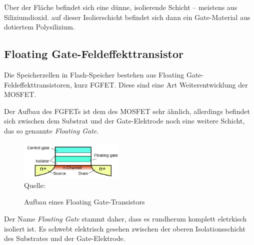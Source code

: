 Über der Fläche befindet sich eine dünne, isolierende Schicht -- meistens aus Siliziumdioxid. auf dieser Isolierschicht befindet sich dann ein Gate-Material aus \gls{dotiert}em Polysilizium.

\subsection{Floating Gate-Feldeffekttransistor}\label{sec:fgfet}
Die Speicherzellen in Flash-Speicher bestehen aus Floating Gate-Feldeffekttransistoren, kurz FGFET. Diese sind eine Art Weiterentwicklung der MOSFET.

Der Aufbau des FGFETs ist dem des MOSFET sehr ähnlich, allerdings befindet sich zwischen dem Substrat und der Gate-Elektrode noch eine weitere Schicht, das so genannte \emph{Floating Gate}.

\begin{figure}[h]
    \centering
    \caption{Aufbau eines Floating Gate-Transistors}
    \includegraphics[width=5cm]{sections/img/fgfet_aufbau}
    \label{fig:fgfet.aufbau}
    \\ Quelle: \cite{fgfetwiki}
\end{figure}

Der Name \emph{Floating Gate} stammt daher, dass es rundherum komplett eletrkisch isoliert ist. Es schwebt elektrisch gesehen zwischen der oberen Isolationsschicht des Substrates und der Gate-Elektrode.